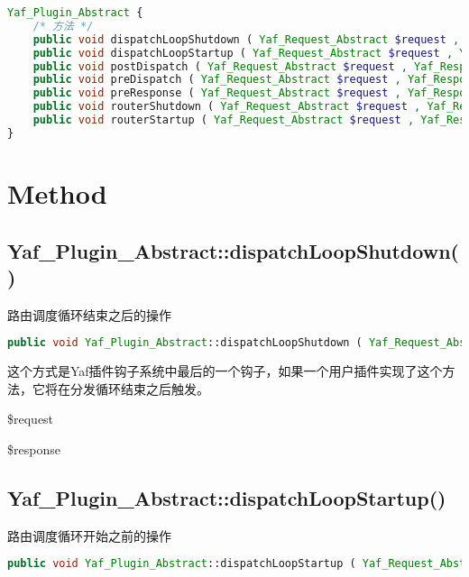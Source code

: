 \begin{lstlisting}[language=PHP]
Yaf_Plugin_Abstract {
    /* 方法 */
    public void dispatchLoopShutdown ( Yaf_Request_Abstract $request , Yaf_Response_Abstract $response )
    public void dispatchLoopStartup ( Yaf_Request_Abstract $request , Yaf_Response_Abstract $response )
    public void postDispatch ( Yaf_Request_Abstract $request , Yaf_Response_Abstract $response )
    public void preDispatch ( Yaf_Request_Abstract $request , Yaf_Response_Abstract $response )
    public void preResponse ( Yaf_Request_Abstract $request , Yaf_Response_Abstract $response )
    public void routerShutdown ( Yaf_Request_Abstract $request , Yaf_Response_Abstract $response )
    public void routerStartup ( Yaf_Request_Abstract $request , Yaf_Response_Abstract $response )
}
\end{lstlisting}

\section{Method}

\subsection{Yaf\_Plugin\_Abstract::dispatchLoopShutdown()}


路由调度循环结束之后的操作



\begin{lstlisting}[language=PHP]
public void Yaf_Plugin_Abstract::dispatchLoopShutdown ( Yaf_Request_Abstract $request , Yaf_Response_Abstract $response )
\end{lstlisting}

这个方式是Yaf插件钩子系统中最后的一个钩子，如果一个用户插件实现了这个方法，它将在分发循环结束之后触发。

\begin{compactitem}
\item \$request
\item \$response
\end{compactitem}



\subsection{Yaf\_Plugin\_Abstract::dispatchLoopStartup()}

路由调度循环开始之前的操作


\begin{lstlisting}[language=PHP]
public void Yaf_Plugin_Abstract::dispatchLoopStartup ( Yaf_Request_Abstract $request , Yaf_Response_Abstract $response )
\end{lstlisting}

